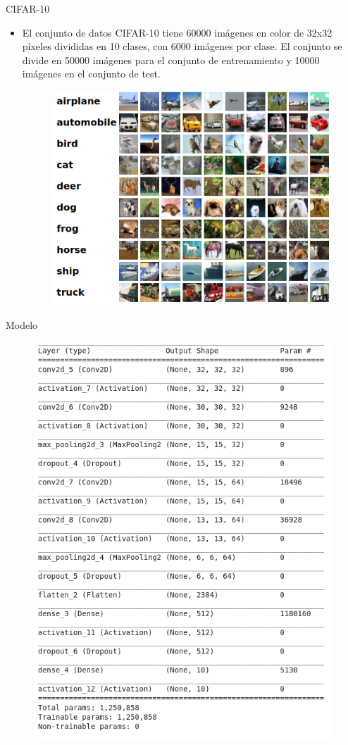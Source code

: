 \documentclass[spanish]{beamer}
\begin{document}
\begin{frame}{CIFAR-10}
\begin{itemize}
  \item El conjunto de datos CIFAR-10 tiene 60000 imágenes en color de 32x32 píxeles divididas en 10 clases, con 6000 imágenes por clase. El conjunto se divide en 50000 imágenes para el conjunto de entrenamiento y 10000 imágenes en el conjunto de test.
  \begin{figure}[h]
    \centering
    \includegraphics[width=.6\textwidth]{img/cifar10}
  \end{figure}
\end{itemize}

\end{frame}

\begin{frame}{Modelo}
  \begin{figure}[h]
    \centering
    \includegraphics[width=.5\textwidth]{img/model}
  \end{figure}
\end{frame}
\end{document}
